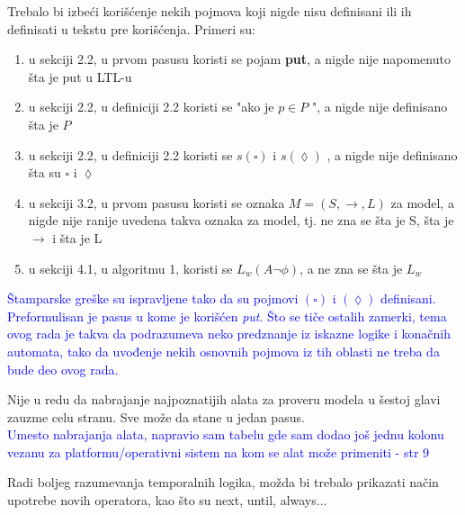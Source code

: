\documentclass[a4paper]{report}
\newcommand{\odgovor}[1]{\textcolor{blue}{#1}}
\begin{document}
Trebalo bi izbeći korišćenje nekih pojmova koji nigde nisu definisani ili ih definisati u tekstu pre korišćenja. Primeri su:
\begin{enumerate}
\item u sekciji 2.2, u prvom pasusu koristi se pojam \textbf{put}, a nigde nije napomenuto šta je put u LTL-u
\item u sekciji 2.2, u definiciji 2.2 koristi se "ako je $ p \in P $ ", a nigde nije definisano šta je  $P$
\item u sekciji 2.2, u definiciji 2.2 koristi se $ s(\square) $ i $s(\lozenge)$ , a nigde nije definisano šta su $\square$ i  $\lozenge$
\item u sekciji 3.2, u prvom pasusu koristi se oznaka $M = (S,\rightarrow, L)$ za model, a nigde nije ranije uvedena takva oznaka za model, tj. ne zna se šta je S, šta je $\rightarrow$ i šta je L
\item u sekciji 4.1, u algoritmu 1, koristi se $L_{w}(A\neg\phi)$, a ne zna se šta je $L_{w}$
\end {enumerate}

\odgovor{Štamparske greške su ispravljene tako da su pojmovi $(\square) $ i $(\lozenge)$ definisani. Preformulisan je pasus u kome je korišćen \emph{put}. Što se tiče ostalih zamerki, tema ovog rada je takva da podrazumeva neko predznanje iz iskazne logike i konačnih automata, tako da uvođenje nekih osnovnih pojmova iz tih oblasti ne treba da bude deo ovog rada. }



Nije u redu da nabrajanje najpoznatijih alata za proveru modela u šestoj glavi zauzme celu stranu. Sve može da stane u jedan pasus.\\
\odgovor{Umesto nabrajanja alata, napravio sam tabelu gde sam dodao još jednu kolonu vezanu za platformu/operativni sistem na kom se alat može primeniti - str 9}

Radi boljeg razumevanja temporalnih logika, možda bi trebalo prikazati način upotrebe novih operatora, kao što su next, until, always...
\end{document}
